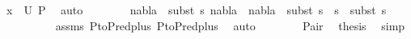 \begin{isabellebody}
\ {\isacartoucheopen}x\ {\isasymin}\ U\ P{\isacartoucheclose}\ \isamarkupfalse%
\ auto\isanewline
\ \ \ \ \ \ \isamarkupfalse%
\ {\isachardoublequoteopen}nabla{}\ {\isasymTurnstile}\ {\isacharparenleft}{\kern0pt}subst\ s{}{\isacharparenright}{\kern0pt}\ nabla\ {\isasymand}\ nabla{}\ {\isasymTurnstile}\ subst\ {\isacharparenleft}{\kern0pt}s{}\ {\isasymbullet}\ s{\isacharparenright}{\kern0pt}\ {\isasymapprox}\ subst\ s{}{\isachardoublequoteclose}\isanewline
\ \ \ \ \ \ \ \ \isamarkupfalse%
\ assms\ P{}{\isacharunderscore}{\kern0pt}to{\isacharunderscore}{\kern0pt}P{}{\isacharunderscore}{\kern0pt}red{\isacharunderscore}{\kern0pt}plus{}\ P{}{\isacharunderscore}{\kern0pt}to{\isacharunderscore}{\kern0pt}P{}{\isacharunderscore}{\kern0pt}red{\isacharunderscore}{\kern0pt}plus{}\ \isamarkupfalse%
\ auto{\isacharplus}{\kern0pt}\isanewline
\ \ \ \ \ \ \isamarkupfalse%
\ Pair\ \isamarkupfalse%
\ {\isacharquery}{\kern0pt}thesis\ \isamarkupfalse%
\ simp\isanewline
\ \ \ \ \isamarkupfalse%
\isanewline
\ \ \isamarkupfalse%
\isanewline
{}\isamarkupfalse%
%
\endisatagproof
{\isafoldproof}%
%
\isadelimproof
\isanewline
%
\endisadelimproof
\isanewline
\isanewline
%
\isadelimtheory
%
\endisadelimtheory
%
\isatagtheory
%
\endisatagtheory
{\isafoldtheory}%
%
\isadelimtheory
%
\endisadelimtheory
%
\end{isabellebody}%
\endinput
